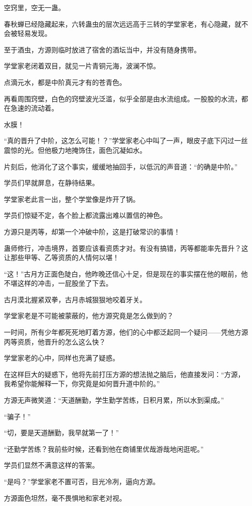 \begin{this_body}
空窍里，空无一蛊。

春秋蝉已经隐藏起来，六转蛊虫的层次远远高于三转的学堂家老，有心隐藏，就不会被轻易发现。

至于酒虫，方源则临时放进了宿舍的酒坛当中，并没有随身携带。

学堂家老闭着双目，就见一片青铜元海，波澜不惊。

点滴元水，都是中阶真元才有的苍青色。

再看周围窍壁，白色的窍壁波光泛滥，似乎全部是由水流组成。一股股的水流，都在急速的流动着。

水膜！

“真的晋升了中阶，这怎么可能！？”学堂家老心中叫了一声，眼皮子底下闪过一丝震惊的光。但他极力地掩饰住，面色沉凝如水。

片刻后，他消化了这个事实，缓缓地抽回手，以低沉的声音道：“的确是中阶。”

学员们早就屏息，在静待结果。

学堂家老此言一出，整个学堂像是炸开了锅。

学员们惊疑不定，各个脸上都流露出难以置信的神色。

方源只是丙等，却第一个冲破中阶，这是打破常识的事情！

蛊师修行，冲击境界，首要应该看资质才对。有没有搞错，丙等都能率先晋升？这让那些甲等、乙等资质的人情何以堪！

“这！”古月方正面色陡白，他昨晚还信心十足，但是现在的事实摆在他的眼前，他不堪这样的冲击，一屁股坐了下去。

古月漠北握紧双拳，古月赤城狠狠地咬着牙关。

学堂家老是不可能被蒙蔽的，他方源究竟是怎么做到的？

一时间，所有少年都死死地盯着方源，他们的心中都泛起同一个疑问——凭他方源丙等资质，他晋升的怎么这么快？

学堂家老的心中，同样也充满了疑惑。

在这样巨大的疑惑下，他将先前打压方源的想法抛之脑后，他直接发问：“方源，我希望你能解释一下，你究竟是如何晋升道中阶的。”

方源无声微笑道：“天道酬勤，学生勤学苦练，日积月累，所以水到渠成。”

“骗子！”

“切，要是天道酬勤，我早就第一了！”

“还勤学苦练？我前些时候，还看到他在商铺里优哉游哉地闲逛呢。”

学员们显然不满意这样的答案。

“是吗？”学堂家老不置可否，目光冷冽，逼向方源。

方源面色坦然，毫不畏惧地和家老对视。


\end{this_body}
